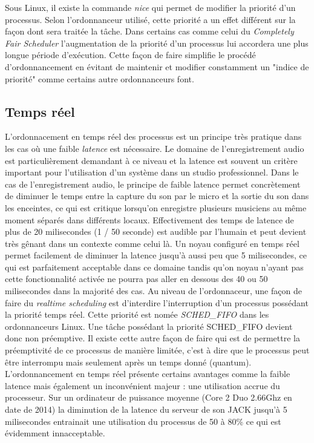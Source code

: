 \documentclass{article}
\begin{document}
\newline
\newline

Sous Linux, il existe la commande \emph{nice} qui permet de modifier la priorité d'un processus. Selon l'ordonnanceur utilisé, cette priorité a un effet différent sur la façon dont sera traitée la tâche. Dans certains cas comme celui du \emph{Completely Fair Scheduler} l'augmentation de la priorité d'un processus lui accordera une plus longue période d'exécution. Cette façon de faire simplifie le procédé d'ordonnancement en évitant de maintenir et modifier constamment un "indice de priorité" comme certains autre ordonnanceurs font.


\subsection{Temps réel}

L'ordonnacement en temps réel des processus est un principe très pratique dans les cas où une faible \emph{latence} est nécessaire. Le domaine de l'enregistrement audio est particulièrement demandant à ce niveau et la latence est souvent un critère important pour l'utilisation d'un système dans un studio professionnel.
\newline
\newline
Dans le cas de l'enregistrement audio, le principe de faible latence permet concrètement de diminuer le temps entre la capture du son par le micro et la sortie du son dans les enceintes, ce qui est critique lorsqu'on enregistre plusieurs musiciens au même moment séparés dans différents locaux. Effectivement des temps de latence de plus de 20 milisecondes (1 / 50 seconde) est audible par l'humain et peut devient très gênant dans un contexte comme celui là. Un noyau configuré en temps réel permet facilement de diminuer la latence jusqu'à aussi peu que 5 milisecondes, ce qui est parfaitement acceptable dans ce domaine tandis qu'on noyau n'ayant pas cette fonctionnalité activée ne pourra pas aller en dessous des 40 ou 50 milisecondes dans la majorité des cas.
\newline
\newline
Au niveau de l'ordonnaceur, une façon de faire du \emph{realtime scheduling} est d'interdire l'interruption d'un processus possédant la priorité temps réel. Cette priorité est nomée \emph{SCHED_FIFO} dans les ordonnanceurs Linux. Une tâche possédant la priorité SCHED_FIFO devient donc non préemptive. Il existe cette autre façon de faire qui est de permettre la préemptivité de ce processus de manière limitée, c'est à dire que le processus peut être interrompu mais seulement après un temps donné (quantum).
\newline
\newline
L'ordonnancement en temps réel présente certains avantages comme la faible latence mais également un inconvénient majeur : une utilisation accrue du processeur. Sur un ordinateur de puissance moyenne (Core 2 Duo 2.66Ghz en date de 2014) la diminution de la latence du serveur de son JACK jusqu'à 5 milisecondes entrainait une utilisation du processus de 50 à 80\% ce qui est évidemment innacceptable.
 
\end{document}
